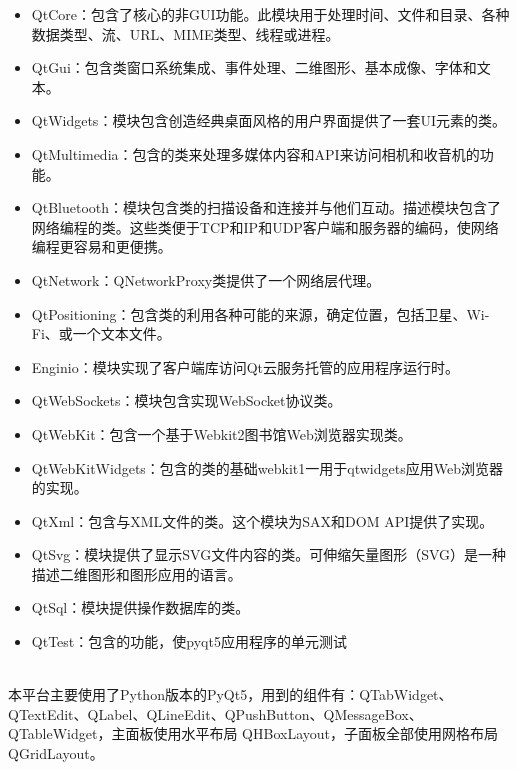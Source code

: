 \documentclass[cn,11pt,chinese]{elegantbook}
\begin{document}
\begin{itemize}
\item QtCore：包含了核心的非GUI功能。此模块用于处理时间、文件和目录、各种数据类型、流、URL、MIME类型、线程或进程。
\item QtGui：包含类窗口系统集成、事件处理、二维图形、基本成像、字体和文本。
\item QtWidgets：模块包含创造经典桌面风格的用户界面提供了一套UI元素的类。
\item QtMultimedia：包含的类来处理多媒体内容和API来访问相机和收音机的功能。
\item QtBluetooth：模块包含类的扫描设备和连接并与他们互动。描述模块包含了网络编程的类。这些类便于TCP和IP和UDP客户端和服务器的编码，使网络编程更容易和更便携。
\item QtNetwork：QNetworkProxy类提供了一个网络层代理。
\item QtPositioning：包含类的利用各种可能的来源，确定位置，包括卫星、Wi-Fi、或一个文本文件。
\item Enginio：模块实现了客户端库访问Qt云服务托管的应用程序运行时。
\item QtWebSockets：模块包含实现WebSocket协议类。
\item QtWebKit：包含一个基于Webkit2图书馆Web浏览器实现类。
\item QtWebKitWidgets：包含的类的基础webkit1一用于qtwidgets应用Web浏览器的实现。
\item QtXml：包含与XML文件的类。这个模块为SAX和DOM API提供了实现。
\item QtSvg：模块提供了显示SVG文件内容的类。可伸缩矢量图形（SVG）是一种描述二维图形和图形应用的语言。
\item QtSql：模块提供操作数据库的类。
\item QtTest：包含的功能，使pyqt5应用程序的单元测试
\end{itemize}
~\\

本平台主要使用了Python版本的PyQt5，用到的组件有：QTabWidget、QTextEdit、QLabel、QLineEdit、QPushButton、QMessageBox、QTableWidget，主面板使用水平布局 QHBoxLayout，子面板全部使用网格布局 QGridLayout。
~\\
\end{document}
